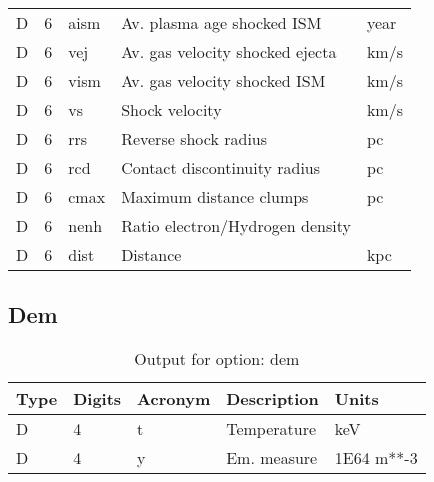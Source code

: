 \begin{table}[!p]
\begin{tabular}{lllll}
D &  6 & aism & Av. plasma age shocked ISM       & year             \\
D &  6 & vej  & Av. gas velocity shocked ejecta  & km/s             \\
D &  6 & vism & Av. gas velocity shocked ISM     & km/s             \\
D &  6 & vs   & Shock velocity                   & km/s             \\
D &  6 & rrs  & Reverse shock radius             & pc               \\
D &  6 & rcd  & Contact discontinuity radius     & pc               \\
D &  6 & cmax & Maximum distance clumps          & pc               \\
D &  6 & nenh & Ratio electron/Hydrogen density  &                  \\
D &  6 & dist & Distance                         & kpc              \\
\hline
\end{tabular}
\end{table}

\subsection{Dem}

\begin{table}[!p]
\caption{Output for option: dem}
\label{tabout:dem}
\begin{tabular}{lllll}
\hline
Type & Digits & Acronym & Description & Units \\ 
\hline
D &  4 & t    & Temperature                      & keV              \\
D &  4 & y    & Em. measure                      & 1E64 m**-3       \\
\hline
\end{tabular}
\end{table}

